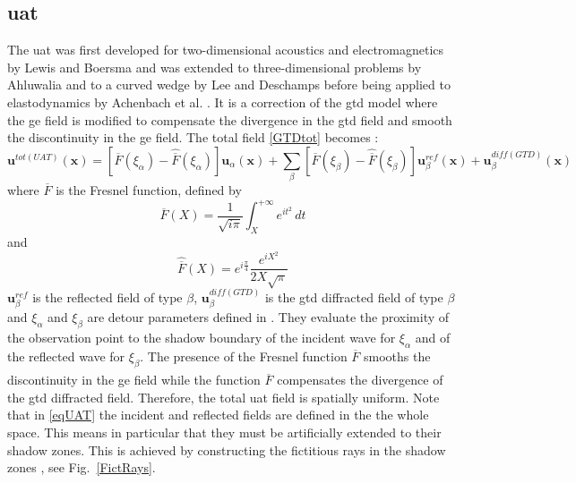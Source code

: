 \subsection{\acrfull{uat}}
The \acrfull{uat} was first developed for two-dimensional acoustics and electromagnetics by Lewis and Boersma \cite{Lewis} and was extended to three-dimensional problems by Ahluwalia \cite{Ahluwalia} and to a curved wedge by Lee and Deschamps \cite{LeeDeschamps} before being applied to elastodynamics by Achenbach et al. \cite{Achenbach}. It is a correction of the \acrshort{gtd} model where the \acrshort{ge} field is modified to compensate the divergence in the \acrshort{gtd} field and smooth the discontinuity in the \acrshort{ge} field. The total field \eqref{GTDtot} becomes :
\begin{equation}
\mathbf{u}^{tot(UAT)}(\mathbf{x})=\left[ \overline{F}(\xi_{\alpha})-\hat{\overline{F}}(\xi_{\alpha})\right]\mathbf{u}_{\alpha}(\mathbf{x})+\sum_{\beta} \left[ \overline{F}(\xi_{\beta})-\hat{\overline{F}}(\xi_{\beta})\right]\mathbf{u}^{ref}_{\beta}(\mathbf{x})+\mathbf{u}_{\beta}^{diff(GTD)}(\mathbf{x})
\label{eqUAT}
\end{equation}
where $\overline{F}$ is the Fresnel function, defined by 
\begin{equation}
\overline{F}(X)=\frac{1}{\sqrt{i\pi}}\int_X^{+\infty} e^{it^2}\,dt
\label{defFresnel}
\end{equation}
and 
\begin{equation}
\hat{\overline{F}}(X)=e^{i\frac{\pi}{4}}\dfrac{e^{iX^2}}{2X\sqrt{\pi}}
\end{equation}
$\mathbf{u}^{ref}_{\beta}$ is the reflected field of type $\beta$, $\mathbf{u}_{\beta}^{diff(GTD)}$ is the \acrshort{gtd} diffracted field of type $\beta$ and $\xi_{\alpha}$ and $\xi_{\beta}$ are detour parameters defined in \cite{LeeDeschamps}. They evaluate the proximity of the observation point to the shadow boundary of the incident wave for $\xi_{\alpha}$ and of the reflected wave for $\xi_{\beta}$. The presence of the Fresnel function $\overline{F}$ smooths the discontinuity in the \acrshort{ge} field while the function $\hat{\overline{F}}$ compensates the divergence of the \acrshort{gtd} diffracted field. Therefore, the total \acrshort{uat} field is spatially uniform. Note that in \eqref{eqUAT} the incident and reflected fields are defined in the the whole space. This means in particular that they must be artificially extended to their shadow zones. This is achieved by constructing the fictitious rays in the shadow zones \cite{Bouche,Molinet}, see Fig.~\ref{FictRays}. 

